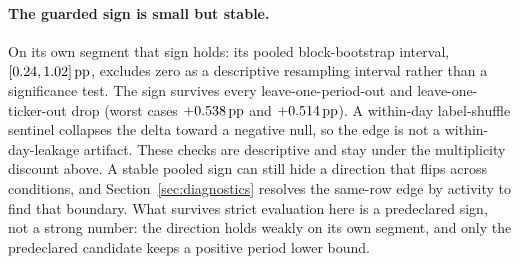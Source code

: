 \paragraph{The guarded sign is small but stable.}
On its own segment that sign holds: its pooled block-bootstrap
interval, $[0.24, 1.02]\,\textrm{pp}{}$, excludes zero as a descriptive resampling interval rather
than a significance test. The sign survives every leave-one-period-out and
leave-one-ticker-out drop (worst cases $+0.538\,\textrm{pp}{}$ and $+0.514\,\textrm{pp}{}$). A within-day
label-shuffle sentinel collapses the delta toward a negative null, so
the edge is not a within-day-leakage artifact. These checks are descriptive and stay
under the multiplicity discount above. A stable pooled sign can still hide a direction
that flips across conditions, and Section~\ref{sec:diagnostics} resolves the same-row
edge by activity to find that boundary. What survives strict evaluation here is a
predeclared sign, not a strong number: the direction holds weakly on its own segment,
and only the predeclared candidate keeps a positive period lower bound.
